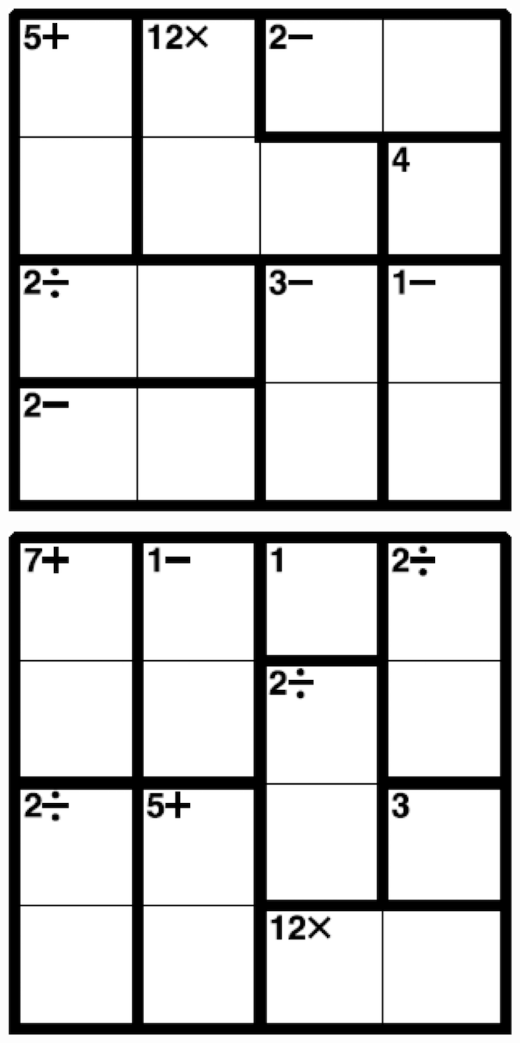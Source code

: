 
\includegraphics[scale=1]{Gambar/Lampiran/4x4_27.png}

\includegraphics[scale=1]{Gambar/Lampiran/4x4_28.png}
